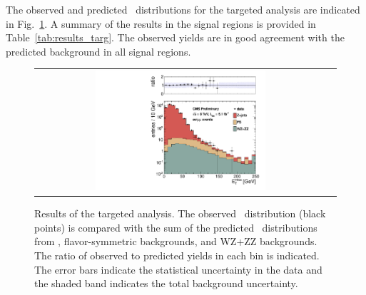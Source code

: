 \clearpage

The observed and predicted \MET\ distributions for the
targeted analysis are indicated in Fig.~\ref{fig:results_targ}. A summary of the results in the signal regions is provided in
Table~\ref{tab:results_targ}. The observed yields are in good agreement with the predicted background in all signal regions.

\begin{figure}[!h]
\begin{center}
\begin{tabular}{cc}
\includegraphics[width=0.6\textwidth]{plots/met_bveto_0.pdf}
\end{tabular}
\caption{Results of the targeted analysis. The observed \MET\ distribution (black points) is compared with the sum of the predicted \MET\
distributions from \zjets, flavor-symmetric backgrounds, and WZ+ZZ backgrounds. The ratio of observed to predicted yields in each bin is
indicated. The error bars indicate the statistical uncertainty in the data and the shaded band indicates the total background uncertainty.
\label{fig:results_targ}
}
\end{center}
\end{figure}



